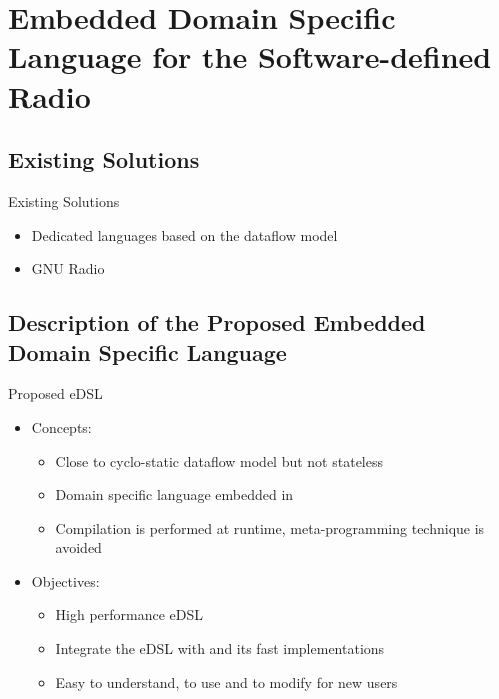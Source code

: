 
\section[eDSL for the SDR]{Embedded Domain Specific Language for the Software-defined Radio}

\subsection[Existing Solutions]{Existing Solutions}

\begin{frame}{Existing Solutions}
  \vfill
  \begin{itemize}
    \item Dedicated languages based on the dataflow model~\cite{Dennis1980,Engels1994}
    \item GNU Radio~\cite{GNURadio}
  \end{itemize}
  \vfill
\end{frame}

\subsection[Proposed eDSL]{Description of the Proposed Embedded Domain Specific Language}

\begin{frame}{Proposed eDSL}
  \vfill
  \begin{itemize}
    \item Concepts:
    \begin{itemize}
      \item Close to cyclo-static dataflow model but not stateless
      \item Domain specific language embedded in \Cxx
      \item Compilation is performed at runtime, meta-programming technique is avoided
    \end{itemize}
    \vspace{0.3cm}
    \item Objectives:
    \begin{itemize}
      \item High performance eDSL
      \item Integrate the eDSL with \AFFECT and its fast implementations
      \item Easy to understand, to use and to modify for new users
    \end{itemize}
  \end{itemize}
  \vfill
\end{frame}

